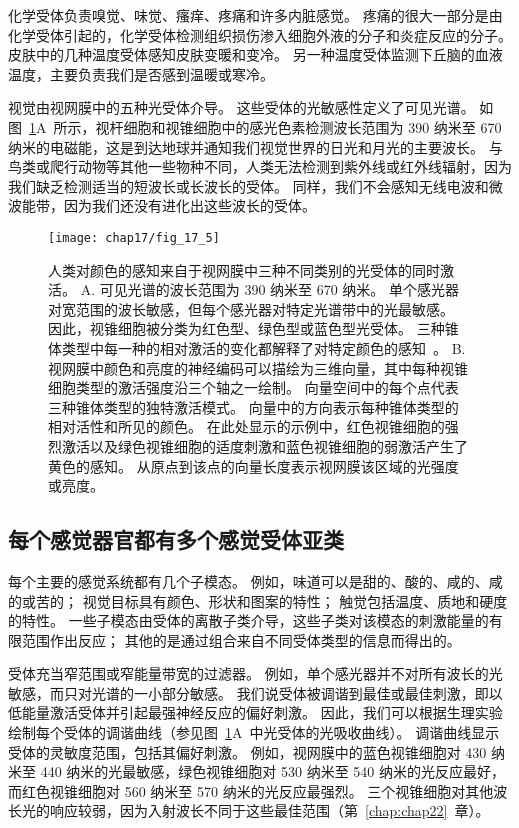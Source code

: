 化学受体负责嗅觉、味觉、瘙痒、疼痛和许多内脏感觉。 
疼痛的很大一部分是由化学受体引起的，化学受体检测组织损伤渗入细胞外液的分子和炎症反应的分子。 
皮肤中的几种温度受体感知皮肤变暖和变冷。 
另一种温度受体监测下丘脑的血液温度，主要负责我们是否感到温暖或寒冷。


视觉由视网膜中的五种光受体介导。 
这些受体的光敏感性定义了可见光谱。 
如图~\ref{fig:17_5}A~所示，视杆细胞和视锥细胞中的感光色素检测波长范围为 390 纳米至 670 纳米的电磁能，这是到达地球并通知我们视觉世界的日光和月光的主要波长。
与鸟类或爬行动物等其他一些物种不同，人类无法检测到紫外线或红外线辐射，因为我们缺乏检测适当的短波长或长波长的受体。
同样，我们不会感知无线电波和微波能带，因为我们还没有进化出这些波长的受体。


\begin{figure}[htbp]
	\centering
	\texttt{[image: chap17/fig\_17\_5]}
	\caption{人类对颜色的感知来自于视网膜中三种不同类别的光受体的同时激活。
		A. 可见光谱的波长范围为 390 纳米至 670 纳米。
		单个感光器对宽范围的波长敏感，但每个感光器对特定光谱带中的光最敏感。
		因此，视锥细胞被分类为红色型、绿色型或蓝色型光受体。
		三种锥体类型中每一种的相对激活的变化都解释了对特定颜色的感知~\cite{dowling1987retina}。
		B. 视网膜中颜色和亮度的神经编码可以描绘为三维向量，其中每种视锥细胞类型的激活强度沿三个轴之一绘制。
		向量空间中的每个点代表三种锥体类型的独特激活模式。
		向量中的方向表示每种锥体类型的相对活性和所见的颜色。
		在此处显示的示例中，红色视锥细胞的强烈激活以及绿色视锥细胞的适度刺激和蓝色视锥细胞的弱激活产生了黄色的感知。
		从原点到该点的向量长度表示视网膜该区域的光强度或亮度。}
	\label{fig:17_5}
\end{figure}



\subsection{每个感觉器官都有多个感觉受体亚类}

每个主要的感觉系统都有几个子模态。 
例如，味道可以是甜的、酸的、咸的、咸的或苦的； 
视觉目标具有颜色、形状和图案的特性； 
触觉包括温度、质地和硬度的特性。 
一些子模态由受体的离散子类介导，这些子类对该模态的刺激能量的有限范围作出反应； 
其他的是通过组合来自不同受体类型的信息而得出的。


受体充当窄范围或窄能量带宽的过滤器。 
例如，单个感光器并不对所有波长的光敏感，而只对光谱的一小部分敏感。 
我们说受体被调谐到最佳或最佳刺激，即以低能量激活受体并引起最强神经反应的偏好刺激。
因此，我们可以根据生理实验绘制每个受体的调谐曲线（参见图~\ref{fig:17_5}A~中光受体的光吸收曲线）。
调谐曲线显示受体的灵敏度范围，包括其偏好刺激。
例如，视网膜中的蓝色视锥细胞对 430 纳米至 440 纳米的光最敏感，绿色视锥细胞对 530 纳米至 540 纳米的光反应最好，而红色视锥细胞对 560 纳米至 570 纳米的光反应最强烈。 
三个视锥细胞对其他波长光的响应较弱，因为入射波长不同于这些最佳范围（第~\ref{chap:chap22}~章）。


